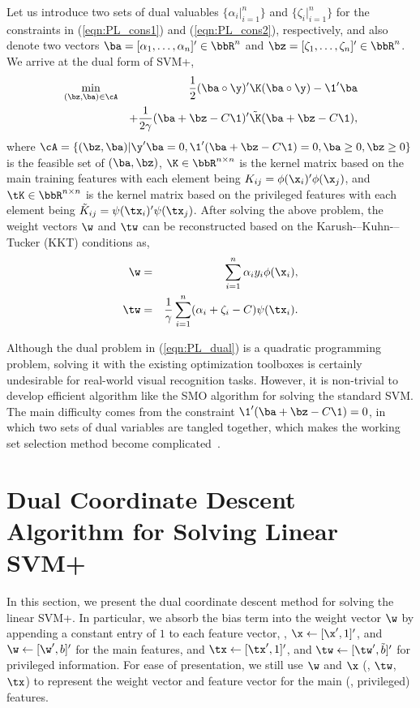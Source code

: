 Let us introduce two sets of dual valuables $\{\alpha_i|_{i=1}^n\}$ and  $\{\zeta_i|_{i=1}^n\}$ for the constraints in (\ref{eqn:PL_cons1}) and (\ref{eqn:PL_cons2}), respectively, and also denote two vectors $\ba = [\alpha_1, \ldots, \alpha_n]'\in \bbR^n$ and $\bz = [\zeta_1, \ldots, \zeta_n]'\in \bbR^n$.  We arrive at the dual form of SVM+,
\begin{eqnarray}\label{eqn:PL_dual}
\min_{(\bz, \ba) \in \cA} && \frac{1}{2}(\ba\circ\y)'\K(\ba\circ\y) -\1'\ba  \\
&& + \frac{1}{2\gamma}(\ba + \bz - C\1)'\tilde{\K}(\ba + \bz - C\1) \nonumber,
\end{eqnarray}
where $\cA = \{(\bz, \ba)| \y'\ba = 0, \1'(\ba+\bz-C\1) = 0, \ba \geq 0, \bz \geq 0\}$ is the feasible set of $(\ba, \bz)$, $\K\in \bbR^{n\times n}$ is the kernel matrix based on the  main training features with each element being $K_{ij} = \phi(\x_i)'\phi(\x_j)$, and $\tK\in \bbR^{n\times n}$ is the kernel matrix based on the privileged features with each element being $\tilde{K}_{ij} = \psi(\tx_i)'\psi(\tx_j)$. After solving the above problem, the weight vectors $\w$ and $\tw$ can be reconstructed based on the Karush-–Kuhn-–Tucker (KKT) conditions as,
\begin{eqnarray}
\w &=& \sum_{i=1}^n \alpha_iy_i\phi(\x_i) \label{eqn:equation_w},\\
\tw &=& \frac{1}{\gamma}\sum_{i=1}^n (\alpha_i+\zeta_i - C)\psi(\tx_i) \label{eqn:equation_tw}.
\end{eqnarray}

Although the dual problem in (\ref{eqn:PL_dual}) is a quadratic programming problem, solving it with the existing optimization toolboxes is certainly undesirable for real-world visual recognition tasks. However, it is non-trivial to develop efficient algorithm like the SMO algorithm for solving the standard SVM. The main difficulty comes from the constraint $\1'(\ba+\bz-C\1) = 0$, in which two sets of dual variables are tangled together, which makes the working set selection method become complicated~\cite{Pechyony2010}.

\section{Dual Coordinate Descent Algorithm for Solving Linear SVM+}\label{sec:linear_svmplus}
In this section, we present the dual coordinate descent method for solving the linear SVM+. In particular, we absorb the bias term into the weight vector $\w$ by appending a constant entry of $1$ to each feature vector, \ie, $\x\leftarrow [\x', 1]'$, and $\w\leftarrow[\w', b]'$ for the main features, and $\tx\leftarrow [\tx', 1]'$, and $\tw\leftarrow[\tw', \tilde{b}]'$ for privileged information. For ease of presentation, we still use $\w$ and $\x$ (\resp, $\tw$, $\tx$) to represent the weight vector and feature vector for the main (\resp, privileged) features.

